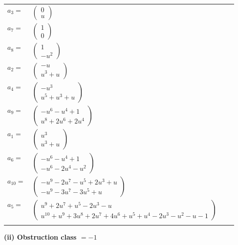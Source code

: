\documentclass[1p]{elsarticle_modified}
\theoremstyle{definition}
\begin{document}
\begin{tabular}{m{7pt} m{180pt} m{7pt} m{180pt} }
\flushright $a_{3}=$&$\begin{pmatrix}0\\u\end{pmatrix}$ \\
\flushright $a_{7}=$&$\begin{pmatrix}1\\0\end{pmatrix}$ \\
\flushright $a_{8}=$&$\begin{pmatrix}1\\- u^2\end{pmatrix}$ \\
\flushright $a_{2}=$&$\begin{pmatrix}- u\\u^3+u\end{pmatrix}$ \\
\flushright $a_{4}=$&$\begin{pmatrix}- u^3\\u^5+u^3+u\end{pmatrix}$ \\
\flushright $a_{9}=$&$\begin{pmatrix}- u^6- u^4+1\\u^8+2 u^6+2 u^4\end{pmatrix}$ \\
\flushright $a_{1}=$&$\begin{pmatrix}u^3\\u^3+u\end{pmatrix}$ \\
\flushright $a_{6}=$&$\begin{pmatrix}- u^6- u^4+1\\- u^6-2 u^4- u^2\end{pmatrix}$ \\
\flushright $a_{10}=$&$\begin{pmatrix}- u^9-2 u^7- u^5+2 u^3+u\\- u^9-3 u^7-3 u^5+u\end{pmatrix}$ \\
\flushright $a_{5}=$&$\begin{pmatrix}u^9+2 u^7+u^5-2 u^3- u\\u^{10}+u^9+3 u^8+2 u^7+4 u^6+u^5+u^4-2 u^3- u^2- u-1\end{pmatrix}$\\&\end{tabular}
\flushleft \textbf{(ii) Obstruction class $= -1$}\\~\\
\end{document}
